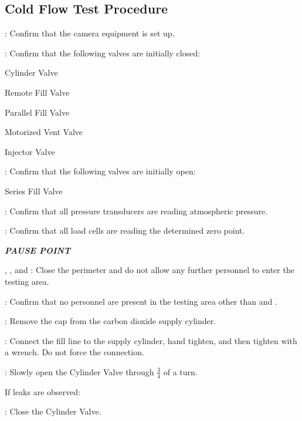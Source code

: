 \subsection{Cold Flow Test Procedure}
\begin{checklist}
    \item \ops{}: Confirm that the camera equipment is set up.
    \item \primary{}: Confirm that the following valves are initially closed:
    \begin{checklist}
        \item Cylinder Valve
        \item Remote Fill Valve
        \item Parallel Fill Valve
        \item Motorized Vent Valve
        \item Injector Valve
    \end{checklist}
    \item \primary{}: Confirm that the following valves are initially open:
    \begin{checklist}
	\item Series Fill Valve
    \end{checklist}
    \item \daq{}: Confirm that all pressure transducers are reading atmospheric pressure.
    \item \daq{}: Confirm that all load cells are reading the determined zero point.
    \item \textbf{\textit{PAUSE POINT}}
    \item \peri{}, \perii{}, and \periii{}: Close the perimeter and do not allow any further personnel to enter the testing area.
    \item \secondary: Confirm that no personnel are present in the testing area other than \primary{} and \secondary.
    \item \primary{}: Remove the cap from the carbon dioxide supply cylinder.
    \item \primary{}: Connect the fill line to the supply cylinder, hand tighten, and then tighten with a wrench. Do not force the connection.
    \item \primary{}: Slowly open the Cylinder Valve through $\frac{3}{4}$  of a turn.
    \begin{checklist}[label=$\bullet$]
        \item If leaks are observed:
        \begin{checklist}
            \item \primary{}: Close the Cylinder Valve.

\end{checklist}
\end{checklist}
\end{checklist}
